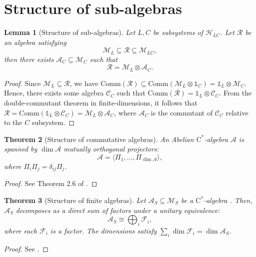 \documentclass[11pt, twocolumn, floatfix, superscriptaddress, aps, prb, raggedbottom]{revtex4-2}
\newtheorem{theorem}{Theorem}[section]
\newtheorem{lemma}[theorem]{Lemma}
\newcommand\marcell[1]{\textcolor{red}{\textbf{#1}}}
\newcommand{\Id}{\mathds{1}}
\newcommand{\cstar}{$\mathrm{C}^*$-algebra }
\begin{document}
\section{Structure of sub-algebras \label{app:sub_algebra_structure}}
\begin{lemma}[Structure of sub-algebras]
    Let $L, C$ be subsystems of  $\mathcal{H}_{LC}$. Let $\mathcal R$ be an algebra satisfying
    \begin{equation}
        \mathcal{M}_L \subseteq \mathcal{R} \subseteq \mathcal{M}_{LC},
    \end{equation}
    then there exists $\mathcal{A}_C \subseteq \mathcal{M}_C$ such that 
    \begin{equation}
        \mathcal{R} = \mathcal{M}_L \otimes \mathcal{A}_C\text{.}
    \end{equation}
    \label{lemma:subalgebra_product}
\end{lemma}
\begin{proof}
    Since $\mathcal{M}_L \subseteq \mathcal{R}$, we have $\mathrm{Comm}(\mathcal{R}) \subseteq \mathrm{Comm}(\mathcal{M}_L \otimes \Id_C) = \Id_L \otimes \mathcal{M}_C$.
    Hence, there exists some algebra $\mathcal{C}_C$ such that $\mathrm{Comm}(\mathcal{R}) = \Id_L \otimes \mathcal{C}_C$.
    From the double-commutant theorem in finite-dimensions, 
    it follows that $\mathcal{R} = \mathrm{Comm}( \Id_L \otimes \mathcal{C}_C) = \mathcal{M}_L \otimes \mathcal{A}_C$, where $\mathcal{A}_C$ is the commutant of $\mathcal{C}_C$ relative to the $C$ subsystem.
\end{proof}
\begin{theorem}[Structure of commutative algebras]
    An Abelian \cstar $\mathcal{A}$ is spanned by $\dim \mathcal{A}$ mutually orthogonal projectors:
    \begin{equation}
        \mathcal{A} = \langle \Pi_1, ..., \Pi_{\dim\mathcal{A}}\rangle,
    \end{equation}
    \label{thm:abelian_structure}
    \noindent where $\Pi_i\Pi_j = \delta_{ij}\Pi_j$.
\end{theorem}
\begin{proof}
    See Theorem 2.6 of \cite{Bény2020}.
\end{proof}

\begin{theorem}[Structure of finite algebras]
    Let $\mathcal{A}_S \subseteq \mathcal{M}_S$ be a \cstar. Then, $\mathcal{A}_S$ decomposes as a direct sum of factors under a unitary equivalence: 
    \begin{equation}
        \mathcal{A}_S \cong \bigoplus_i\mathcal{F}_i, 
    \end{equation}
    \noindent where each $\mathcal{F}_i$ is a factor. The dimensions satisfy $\sum_i\dim \mathcal{F}_i = \dim \mathcal{A}_S$.
\end{theorem}
\begin{proof}
    See \cite{Bény2020, Pedersen2018AutomorphismGroups}.
\end{proof}
\end{document}
